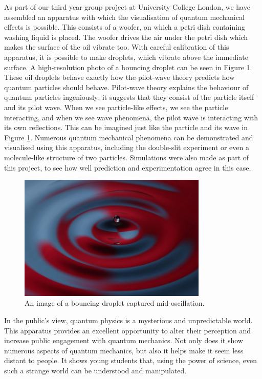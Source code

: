As part of our third year group project at University College London, we have assembled an apparatus with which the visualisation of quantum mechanical effects is possible. This consists of a woofer, on which a petri dish containing washing liquid is placed. The woofer drives the air under the petri dish which makes the surface of the oil vibrate too. With careful calibration of this apparatus, it is possible to make droplets, which vibrate above the immediate surface. A high-resolution photo of a bouncing droplet can be seen in Figure 1. These oil droplets behave exactly how the pilot-wave theory predicts how quantum particles should behave. Pilot-wave theory explains the behaviour of quantum particles ingeniously: it suggests that they consist of the particle itself and its pilot wave. When we see particle-like effects, we see the particle interacting, and when we see wave phenomena, the pilot wave is interacting with its own reflections. This can be imagined just like the particle and its wave in Figure \ref{fig:droplet_STFC_report}. Numerous quantum mechanical phenomena can be demonstrated and visualised using this apparatus, including the double-slit experiment or even a molecule-like structure of two particles. Simulations were also made as part of this project, to see how well prediction and experimentation agree in this case.  

\begin{center}
\begin{figure}[htb]
\centering
    \includegraphics[width=8.996cm,height=5.997cm]{education/STFCproposal/Droplet_STFC.jpg}
    \caption{An image of a bouncing droplet captured mid-oscillation.}
    \label{fig:droplet_STFC_report}
\end{figure} 
\end{center}

In the public's view, quantum physics is a mysterious and unpredictable world. This apparatus provides an excellent opportunity to alter their perception and increase public engagement with quantum mechanics. Not only does it show numerous aspects of quantum mechanics, but also it helps make it seem less distant to people. It shows young students that, using the power of science, even such a strange world can be understood and manipulated.

